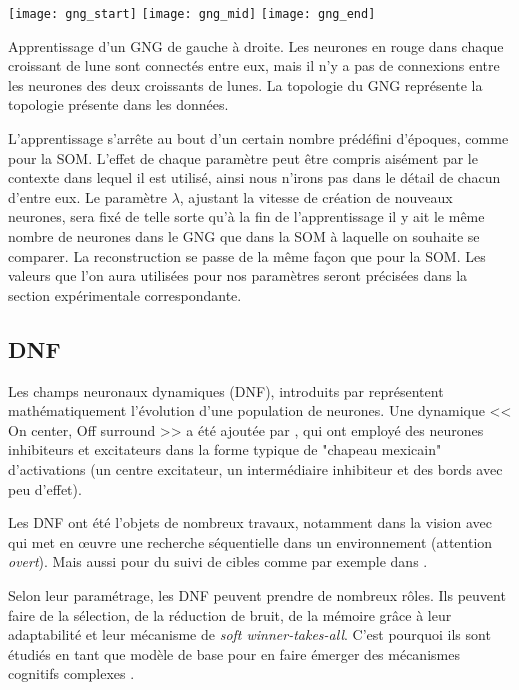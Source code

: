 	\begin{figureth}
		\texttt{[image: gng\_start]}
		\texttt{[image: gng\_mid]}
		\texttt{[image: gng\_end]}
		\caption[Apprentissage de GNG]{Apprentissage d'un GNG de gauche à droite. Les neurones en rouge dans chaque croissant de lune sont connectés entre eux, mais il n'y a pas de connexions entre les neurones des deux croissants de lunes. La topologie du GNG représente la topologie présente dans les données.\footnotemark}\label{fig:gng}
	\end{figureth}

	L'apprentissage s'arrête au bout d'un certain nombre prédéfini d'époques, comme pour la SOM. L'effet de chaque paramètre peut être compris aisément par le contexte dans lequel il est utilisé, ainsi nous n'irons pas dans le détail de chacun d'entre eux. Le paramètre $\lambda$, ajustant la vitesse de création de nouveaux neurones, sera fixé de telle sorte qu'à la fin de l'apprentissage il y ait le même nombre de neurones dans le GNG que dans la SOM à laquelle on souhaite se comparer. La reconstruction se passe de la même façon que pour la SOM. Les valeurs que l'on aura utilisées pour nos paramètres seront précisées dans la section expérimentale correspondante.

	\subsection{DNF}\label{sec:sota:dnf}


	Les champs neuronaux dynamiques (DNF), introduits par \cite{amari1977dynamics} représentent mathématiquement l'évolution d'une population de neurones. Une dynamique << On center, Off surround >> a été ajoutée par \cite{ellias1975pattern}, qui ont employé des neurones inhibiteurs et excitateurs dans la forme typique de "chapeau mexicain" d'activations (un centre excitateur, un intermédiaire inhibiteur et des bords avec peu d'effet).
	
	Les DNF ont été l'objets de nombreux travaux, notamment dans la vision avec \cite{fix2011dynamic} qui met en œuvre une recherche séquentielle dans un environnement (attention \textit{overt}). Mais aussi pour du suivi de cibles comme par exemple dans \cite{martel2016neuromorphic}.

	Selon leur paramétrage, les DNF peuvent prendre de nombreux rôles. Ils peuvent faire de la sélection, de la réduction de bruit, de la mémoire grâce à leur adaptabilité et leur mécanisme de \textit{soft winner-takes-all}. C'est pourquoi ils sont étudiés en tant que modèle de base pour en faire émerger des mécanismes cognitifs complexes \cite{sandamirskaya2014dynamic}.

